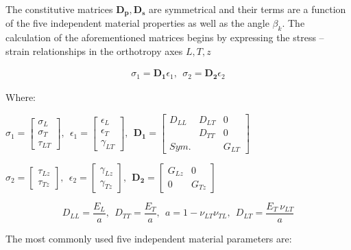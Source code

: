 The constitutive matrices $\mathbf{D_{p}, D_{s}}$ are symmetrical and their
terms are a function of the five independent material properties as well
as the angle $\beta_{k}$. The calculation of the aforementioned
matrices begins by expressing the stress -- strain relationships in the
orthotropy axes $L, T, z$

\begin{equation}    
\begin{array}{r}
\sigma_{1} = \mathbf{D}_{\mathbf{1}}\epsilon_{1},\ \ \sigma_{2} = \mathbf{D}_{\mathbf{2}}\epsilon_{2}
\end{array}
\end{equation}

Where:
\begin{center}

$\sigma_{1} = \begin{bmatrix}
\sigma_{L} \\
\sigma_{T} \\
\tau_{LT}
\end{bmatrix},\ \ \epsilon_{1} = \begin{bmatrix}
\epsilon_{L} \\
\epsilon_{T} \\
\gamma_{LT}
\end{bmatrix},\ \ \mathbf{D}_{\mathbf{1}}=\begin{bmatrix}
D_{LL} & D_{LT} & 0 \\
\  & D_{TT} & 0 \\
Sym. & \  & G_{LT}
\end{bmatrix}$

\vspace{10pt}
$\sigma_{2} = \begin{bmatrix}
\tau_{Lz} \\
\tau_{Tz}
\end{bmatrix},\ \ \epsilon_{2} = \begin{bmatrix}
\gamma_{Lz} \\
\gamma_{Tz}
\end{bmatrix},\ \ \mathbf{D}_{\mathbf{2}}=\begin{bmatrix}
G_{Lz} & 0 \\
0 & G_{Tz}
\end{bmatrix}$
\end{center}

\[D_{LL} = \frac{E_{L}}{a},\ \ D_{TT} = \frac{E_{T}}{a},\ \ a = 1 - \nu_{LT}\nu_{TL},\ \ D_{LT} = \frac{E_{T}\ \nu_{LT}}{a}\]

The most commonly used five independent material parameters are:

